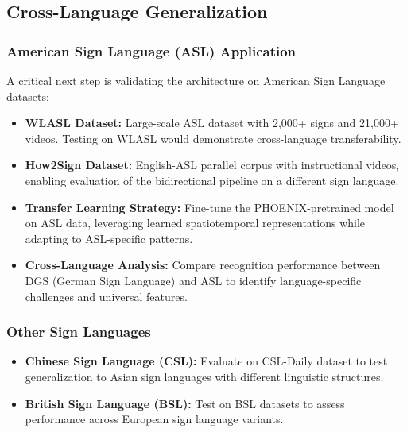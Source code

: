 \documentclass[12pt,a4paper]{article}
\begin{document}
\subsection{Cross-Language Generalization}

\subsubsection{American Sign Language (ASL) Application}

A critical next step is validating the architecture on American Sign Language datasets:

\begin{itemize}[noitemsep]
    \item \textbf{WLASL Dataset:} Large-scale ASL dataset with 2,000+ signs and 21,000+ videos. Testing on WLASL would demonstrate cross-language transferability.
    
    \item \textbf{How2Sign Dataset:} English-ASL parallel corpus with instructional videos, enabling evaluation of the bidirectional pipeline on a different sign language.
    
    \item \textbf{Transfer Learning Strategy:} Fine-tune the PHOENIX-pretrained model on ASL data, leveraging learned spatiotemporal representations while adapting to ASL-specific patterns.
    
    \item \textbf{Cross-Language Analysis:} Compare recognition performance between DGS (German Sign Language) and ASL to identify language-specific challenges and universal features.
\end{itemize}

\subsubsection{Other Sign Languages}

\begin{itemize}[noitemsep]
    \item \textbf{Chinese Sign Language (CSL):} Evaluate on CSL-Daily dataset to test generalization to Asian sign languages with different linguistic structures.
    
    \item \textbf{British Sign Language (BSL):} Test on BSL datasets to assess performance across European sign language variants.
\end{itemize}
\end{document}
